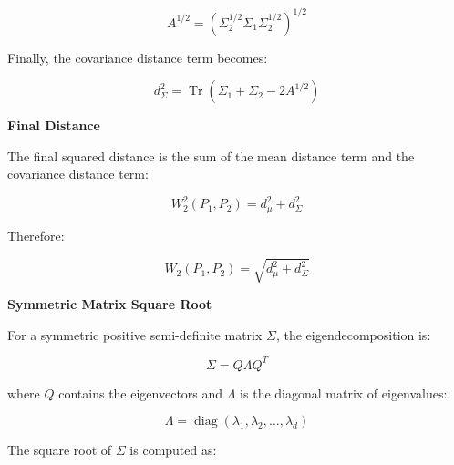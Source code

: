 \documentclass{book}
\providecommand{\ProjectDeepHeading}[2]{%
    \par\medskip\noindent\textbf{#2}\par\smallskip
}
\begin{document}
        \[
            A^{1/2}
            =
            \left(
                \ensuremath{\Sigma}_2^{1/2}
                \ensuremath{\Sigma}_1
                \ensuremath{\Sigma}_2^{1/2}
            \right)^{1/2}
        \]
        
        Finally, the covariance distance term becomes:
        
        \[
            d_{\ensuremath{\Sigma}}^2
            =
            \operatorname{Tr}
            \left(
                \ensuremath{\Sigma}_1
            +
                \ensuremath{\Sigma}_2
            -
            2A^{1/2}
            \right)
        \]
    
    
    \ProjectDeepHeading{6}{Final Distance}
        
        The final squared distance is the sum of the mean distance term and the covariance distance term:
        
        \[
            W_2^2
            \left(
                P_1,
                P_2
            \right)
            =
            d_{\ensuremath{\mu}}^2
            +
            d_{\ensuremath{\Sigma}}^2
        \]
        
        Therefore:
        
        \[
            W_2
            \left(
                P_1,
                P_2
            \right)
            =
            \sqrt{
                d_{\ensuremath{\mu}}^2
                +
                d_{\ensuremath{\Sigma}}^2
            }
        \]
    
    
    \ProjectDeepHeading{6}{Symmetric Matrix Square Root}
        
        For a symmetric positive semi-definite matrix \(\ensuremath{\Sigma}\), the eigendecomposition is:
        
        \[
            \ensuremath{\Sigma}
            =
            Q
            \ensuremath{\Lambda}
            Q^T
        \]
        
        where \(Q\) contains the eigenvectors and \(\ensuremath{\Lambda}\) is the diagonal matrix of eigenvalues:
        
        \[
            \ensuremath{\Lambda}
            =
            \operatorname{diag}
            \left(
                \ensuremath{\lambda}_1,
                \ensuremath{\lambda}_2,
                \ldots,
                \ensuremath{\lambda}_d
            \right)
        \]
        
        The square root of \(\ensuremath{\Sigma}\) is computed as:
        
\end{document}

